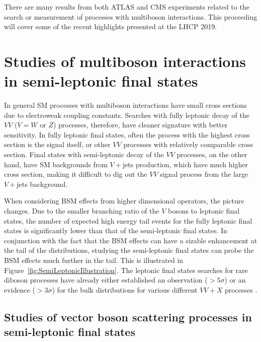 \documentclass[10pt]{article}
\begin{document}
There are many results from both ATLAS and CMS experiments related to the search or measurement of processes with multiboson interactions.
This proceeding will cover some of the recent highlights presented at the LHCP 2019.

\section{Studies of multiboson interactions in semi-leptonic final states}

In general SM processes with multiboson interactions have small cross sections due to electroweak coupling constants.
Searches with fully leptonic decay of the $VV$ ($V=W$ or $Z$) processes, therefore, have cleaner signature with better sensitivity.
In fully leptonic final states, often the process with the highest cross section is the signal itself, or other $VV$ processes with relatively comparable cross section.
Final states with semi-leptonic decay of the $VV$ processes, on the other hand, have SM backgrounds from $V+$jets production, which have much higher cross section, making it difficult to dig out the $VV$ signal process from the large $V+$jets background.

When considering BSM effects from higher dimensional operators, the picture changes.
Due to the smaller branching ratio of the $V$ bosons to leptonic final states, the number of expected high energy tail events for the fully leptonic final states is significantly lower than that of the semi-leptonic final states.
In conjunction with the fact that the BSM effects can have a sizable enhancement at the tail of the distributions, studying the semi-leptonic final states can probe the BSM effects much further in the tail.
This is illustrated in Figure~\ref{fig:SemiLeptonicIllustration}.
The leptonic final states searches for rare diboson processes have already either established an observation ($>5\sigma$) or an evidence ($>3\sigma$) for the bulk distributions for various different $VV+X$ processes \cite{}.

\subsection{Studies of vector boson scattering processes in semi-leptonic final states}
\end{document}
